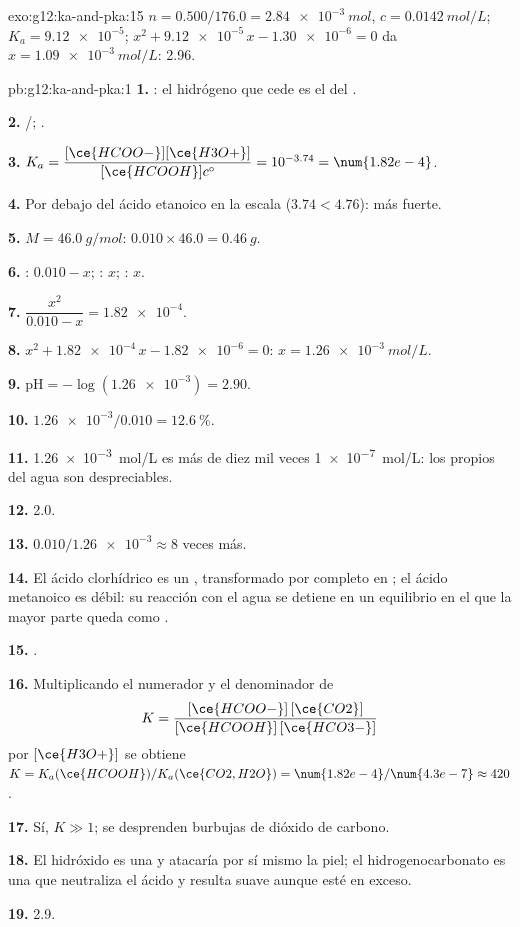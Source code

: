\begin{solution}{exo:g12:ka-and-pka:15}
$n = 0.500 / 176.0 = \qty{2.84e-3}{mol}$, $c = \qty{0.0142}{mol/L}$;
$K_a = \num{9.12e-5}$; $x^2 + \num{9.12e-5}\,x - \num{1.30e-6} = 0$ da
$x = \qty{1.09e-3}{mol/L}$:  2.96.
\end{solution}

\begin{solution}{pb:g12:ka-and-pka:1}
\textbf{1.} : el hidrógeno que cede es el del .

\textbf{2.} /; .

\textbf{3.} $K_a = \dfrac{[\ce{HCOO-}][\ce{H3O+}]}{[\ce{HCOOH}]c^\circ} =
10^{-3.74} = \num{1.82e-4}$.

\textbf{4.} Por debajo del ácido etanoico en la escala ($3.74 < 4.76$):
más fuerte.

\textbf{5.} $M = \qty{46.0}{g/mol}$: $0.010 \times 46.0 = \qty{0.46}{g}$.

\textbf{6.} : $0.010 - x$; : $x$; : $x$.

\textbf{7.} $\dfrac{x^2}{0.010 - x} = \num{1.82e-4}$.

\textbf{8.} $x^2 + \num{1.82e-4}\,x - \num{1.82e-6} = 0$:
$x = \qty{1.26e-3}{mol/L}$.

\textbf{9.} $\mathrm{pH} = -\log(\num{1.26e-3}) = 2.90$.

\textbf{10.} $\num{1.26e-3}/0.010 = \qty{12.6}{\percent}$.

\textbf{11.} \qty{1.26e-3}{mol/L} es más de diez mil veces
\qty{1e-7}{mol/L}: los  propios del agua son despreciables.

\textbf{12.}  2.0.

\textbf{13.} $0.010 / \num{1.26e-3} \approx 8$ veces más.

\textbf{14.} El ácido clorhídrico es un , transformado por
completo en ; el ácido metanoico es débil: su reacción con el agua
se detiene en un equilibrio en el que la mayor parte queda como
.

\textbf{15.} .

\textbf{16.} Multiplicando el numerador y el denominador de
\[
  K = \frac{[\ce{HCOO-}]\,[\ce{CO2}]}{[\ce{HCOOH}]\,[\ce{HCO3-}]}
\]
por $[\ce{H3O+}]$ se obtiene $K = K_a(\ce{HCOOH}) / K_a(\ce{CO2,H2O}) =
\num{1.82e-4}/\num{4.3e-7} \approx 420$.

\textbf{17.} Sí, $K \gg 1$; se desprenden burbujas de dióxido de carbono.

\textbf{18.} El hidróxido es una  y atacaría por sí mismo la
piel; el hidrogenocarbonato es una  que neutraliza el ácido y
resulta suave aunque esté en exceso.

\textbf{19.}  2.9.
\end{solution}

